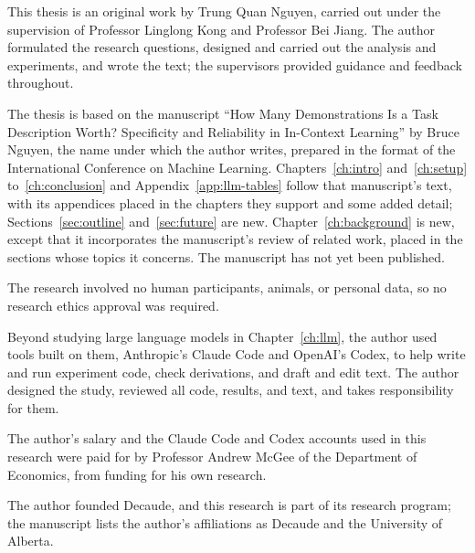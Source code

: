 This thesis is an original work by Trung Quan Nguyen, carried out under the supervision of Professor Linglong Kong and Professor Bei Jiang. The author formulated the research questions, designed and carried out the analysis and experiments, and wrote the text; the supervisors provided guidance and feedback throughout.

The thesis is based on the manuscript ``How Many Demonstrations Is a Task Description Worth? Specificity and Reliability in In-Context Learning'' by Bruce Nguyen, the name under which the author writes, prepared in the format of the International Conference on Machine Learning. Chapters~\ref{ch:intro} and~\ref{ch:setup} to~\ref{ch:conclusion} and Appendix~\ref{app:llm-tables} follow that manuscript's text, with its appendices placed in the chapters they support and some added detail; Sections~\ref{sec:outline} and~\ref{sec:future} are new. Chapter~\ref{ch:background} is new, except that it incorporates the manuscript's review of related work, placed in the sections whose topics it concerns. The manuscript has not yet been published.

The research involved no human participants, animals, or personal data, so no research ethics approval was required.

Beyond studying large language models in Chapter~\ref{ch:llm}, the author used tools built on them, Anthropic's Claude Code and OpenAI's Codex, to help write and run experiment code, check derivations, and draft and edit text. The author designed the study, reviewed all code, results, and text, and takes responsibility for them.

The author's salary and the Claude Code and Codex accounts used in this research were paid for by Professor Andrew McGee of the Department of Economics, from funding for his own research.

The author founded Decaude, and this research is part of its research program; the manuscript lists the author's affiliations as Decaude and the University of Alberta.
